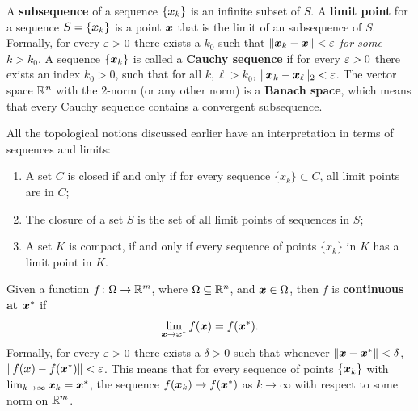\documentclass[11pt,a4paper]{memoir}
\begin{document}
A \textbf{subsequence} of a sequence $\{\bm{x}_k\}$ is an infinite subset of $S$.
A \textbf{limit point} for a sequence $S=\{\bm{x}_k\}$ is a point $\bm{x}$ that is the limit of an subsequence of $S$. Formally, for every $\varepsilon>0$ there exists a $k_0$ such that $\Vert {\bm{x}_k-\bm{x}}\Vert<\varepsilon$ {\em for some} $k>k_0$. A sequence $\{\bm{x}_k\}$ is called a \textbf{Cauchy sequence} if for every $\varepsilon>0$ there exists an index $k_0>0$, such that for all $k,\ell>k_0$, $\Vert {\bm{x}_k-\bm{x}_{\ell}}\Vert_2<\varepsilon$. The vector space $\mathbb{R}^n$ with the $2$-norm (or any other norm) is a \textbf{Banach space}, which means that every Cauchy sequence contains a convergent subsequence.

All the topological notions discussed earlier have an interpretation in terms of sequences and limits:
\begin{enumerate}
\item A set $C$ is closed if and only if for every sequence $\{x_k\}\subset C$, all limit points are in $C$; 
\item The closure of a set $S$ is the set of all limit points of sequences in $S$;
\item A set $K$ is compact, if and only if every sequence of points $\{x_k\}$ in $K$ has a limit point in $K$.
\end{enumerate}

Given a function $f\colon \Omega \to \mathbb{R}^m$, where $\Omega\subseteq \mathbb{R}^n$, and $\bm{x}\in \Omega$, then $f$ is \textbf{continuous at $\bm{x}^*$} if 
\begin{equation*}
 \lim_{\bm{x}\to \bm{x}^*} f(\bm{x}) = f(\bm{x}^*).
\end{equation*}
Formally, for every $\varepsilon>0$ there exists a $\delta>0$ such that whenever $\Vert {\bm{x}-\bm{x}^*}\Vert<\delta$, $\Vert {f(\bm{x})-f(\bm{x}^*)}\Vert<\varepsilon$.
This means that for every sequence of points $\{\bm{x}_k\}$ with $\lim_{k\to \infty}\bm{x}_k=\bm{x}^*$, the sequence $f(\bm{x}_k)\to f(\bm{x}^*)$ as $k\to \infty$ with respect to some norm on $\mathbb{R}^m$.
\end{document}
